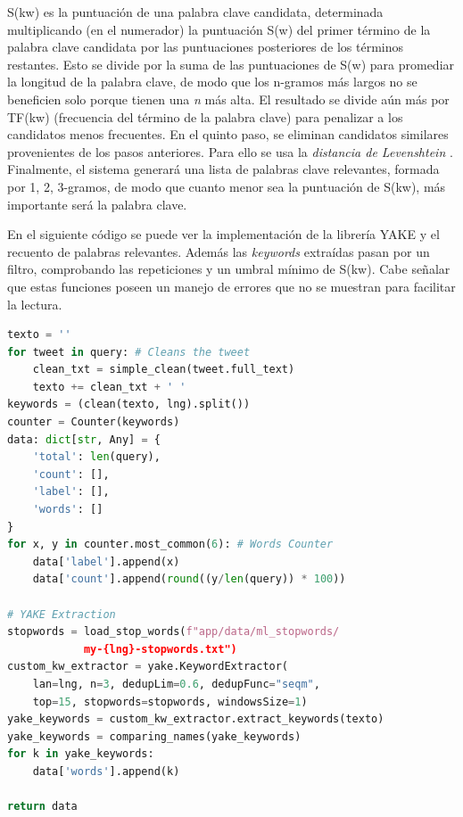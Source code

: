 S(kw) es la puntuación de una palabra clave candidata, determinada multiplicando (en el numerador) la puntuación S(w) del primer término de la palabra clave candidata por las puntuaciones posteriores de los términos restantes. Esto se divide por la suma de las puntuaciones de S(w) para promediar la longitud de la palabra clave, de modo que los n-gramos más largos no se beneficien solo porque tienen una \textit{n} más alta. El resultado se divide aún más por TF(kw) (frecuencia del término de la palabra clave) para penalizar a los candidatos menos frecuentes. En el quinto paso, se eliminan candidatos similares provenientes de los pasos anteriores. Para ello se usa la \textit{distancia de Levenshtein} \cite{levenshtein1966binary}. Finalmente, el sistema generará una lista de palabras clave relevantes, formada por 1, 2, 3-gramos, de modo que cuanto menor sea la puntuación de S(kw), más importante será la palabra clave.

\vspace{0.3cm}

En el siguiente código se puede ver la implementación de la librería \ac{YAKE} y el recuento de palabras relevantes. Además las \textit{keywords} extraídas pasan por un filtro, comprobando las repeticiones y un umbral mínimo de S(kw). Cabe señalar que estas funciones poseen un manejo de errores que no se muestran para facilitar la lectura.

\vspace{0.3cm}

\begin{lstlisting}[caption=Extracción de recuento de palabras y \textit{keywords},          label={lst:listing-python},language=Python]
texto = ''
for tweet in query: # Cleans the tweet
    clean_txt = simple_clean(tweet.full_text)
    texto += clean_txt + ' '
keywords = (clean(texto, lng).split())
counter = Counter(keywords)
data: dict[str, Any] = {
    'total': len(query),
    'count': [],
    'label': [],
    'words': []
}
for x, y in counter.most_common(6): # Words Counter
    data['label'].append(x)
    data['count'].append(round((y/len(query)) * 100))
    
# YAKE Extraction
stopwords = load_stop_words(f"app/data/ml_stopwords/
            my-{lng}-stopwords.txt")
custom_kw_extractor = yake.KeywordExtractor(
    lan=lng, n=3, dedupLim=0.6, dedupFunc="seqm",
    top=15, stopwords=stopwords, windowsSize=1)
yake_keywords = custom_kw_extractor.extract_keywords(texto)
yake_keywords = comparing_names(yake_keywords)
for k in yake_keywords:
    data['words'].append(k)

return data
\end{lstlisting}

